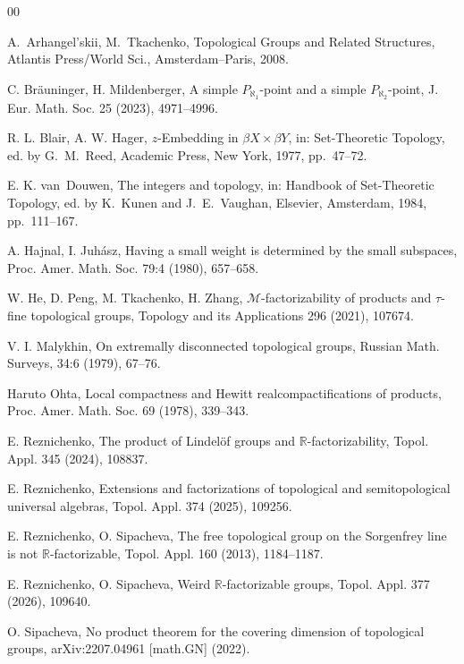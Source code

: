 \documentclass[a4paper,12pt]{amsart}
\theoremstyle{definition}
\theoremstyle{remark}
\begin{document}
\begin{thebibliography}{00}

A.~Arhangel'skii, M.~Tkachenko,
Topological Groups and Related Structures, 
Atlantis Press/World Sci., Amsterdam--Paris, 2008.

C. Br\"auninger, H. Mildenberger, 
A simple $P_{\aleph_1}$-point and a simple $P_{\aleph_2}$-point, 
J. Eur. Math. Soc. 25 (2023), 4971--4996.

R. L. Blair, A. W. Hager, 
$z$-Embedding in $\beta X\times \beta Y$, 
in: Set-Theoretic Topology, ed. by G.~M.~Reed, Academic Press, New York, 1977, pp.~47--72.

E. K. van~Douwen, 
The integers and topology, 
in: Handbook of Set-Theoretic Topology, ed. by K.~Kunen and J.~E.~Vaughan, Elsevier, Amsterdam, 1984, 
pp.~111--167.

A. Hajnal, I. Juh\'asz,
Having a small weight is determined by the small subspaces,
Proc. Amer. Math. Soc. 79:4 (1980), 657--658.

W. He, D. Peng, M. Tkachenko, H. Zhang, 
$\mathcal M$-factorizability of products and $\tau$-fine topological groups, 
Topology and its Applications 296 (2021), 107674.

 V. I. Malykhin, 
On extremally disconnected topological groups, 
Russian Math. Surveys, 34:6 (1979), 67--76.

Haruto Ohta,
Local compactness and Hewitt realcompactifications of products,
Proc. Amer. Math. Soc. 69 (1978), 339--343. 

E. Reznichenko, 
The product of Lindel\"of groups and $\mathbb R$-factorizability, 
Topol. Appl. 345 (2024), 108837.

E. Reznichenko, 
Extensions and factorizations of topological and semitopological universal algebras, 
Topol. Appl. 374 (2025), 109256.

E. Reznichenko, O. Sipacheva, 
The free topological group on the Sorgenfrey line is not $\mathbb R$-factorizable, 
Topol. Appl. 160 (2013), 1184--1187.

E. Reznichenko, O. Sipacheva, 
Weird $\mathbb R$-factorizable groups,
Topol. Appl. 377 (2026), 109640.

O. Sipacheva, 
No product theorem for the covering dimension of topological groups, 
arXiv:2207.04961 [math.GN] (2022).


\end{thebibliography}
\end{document}

